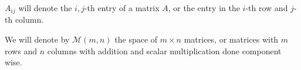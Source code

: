 \begin{rem}
$A_{ij}$ will denote the $i,j$-th entry of a matrix $A$, or the entry in
the $i$-th row and $j$-th column.
\end{rem}

\begin{df}
We will denote by $\mathcal{M}(m, n)$ the space of $m \times n$
matrices, or matrices with $m$ rows and $n$ columns with addition and
scalar multiplication done component wise.
\end{df}
